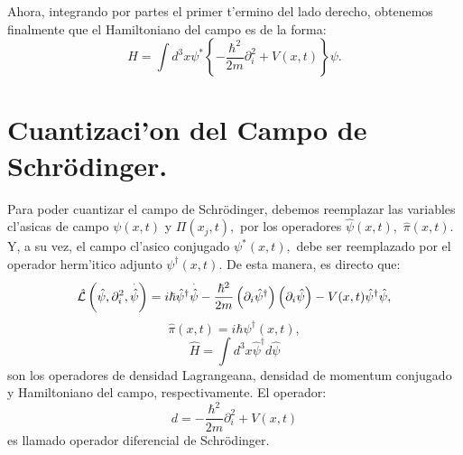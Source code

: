 Ahora, integrando por partes el primer t'ermino del lado derecho,
obtenemos finalmente que el Hamiltoniano del campo es de la forma:%
\begin{equation}
H=\int d^{3}x\psi ^{\ast }\left\{ -\frac{\hbar ^{2}}{2m}\partial
_{i}^{2}+V(x,t)\right\} \psi .
\label{HamiltonianodeSchroginger}
\end{equation}

\section{Cuantizaci'on del Campo de Schr\"{o}dinger.}

Para poder cuantizar el campo de Schr\"{o}dinger, debemos reemplazar las
variables cl'asicas de campo $\psi (x,t)$ y $\Pi \left(
x_{j},t\right) ,$ por los operadores $\hat{\psi}(x,t),$ $%
\hat{\pi}(x,t).$ Y, a su vez, el campo cl'asico
conjugado $\psi ^{\ast }(x,t),$ debe ser reemplazado por el
operador herm'itico adjunto $\psi ^{\dagger }(x,t).$ De
esta manera, es directo que:%
\begin{equation}
\hat{{\cal L}}\left( \hat{\psi},\partial _{i}^{2},\overset{\cdot }{\hat{\psi}%
}\right) =i\hbar \hat{\psi}^{\dagger }\overset{\cdot }{\hat{\psi}}-\frac{%
\hbar ^{2}}{2m}\left( \partial _{i}\hat{\psi}^{\dagger }\right) \left(
\partial _{i}\hat{\psi}\right) -V(x,t)\hat{\psi}^{\dagger }%
\hat{\psi}, \label{OperadorDensidadLagrangeanadeSchrodinger}
\end{equation}%
\begin{equation}
\hat{\pi}(x,t)=i\hbar \psi ^{\dagger }(x,t)
, \label{OperadorDensidaddeMomentumConjugadodePhi}
\end{equation}%
\begin{equation}
\hat{H}=\int d^{3}x\hat{\psi}^{\dagger }d\hat{\psi}
\label{OperadorHamiltonianodeSchrodinger}
\end{equation}%
son los operadores de densidad Lagrangeana, densidad de momentum conjugado y
Hamiltoniano del campo, respectivamente. El operador:%
\begin{equation*}
d=-\frac{\hbar ^{2}}{2m}\partial _{i}^{2}+V(x,t)
\end{equation*}%
es llamado operador diferencial de Schr\"{o}dinger.

